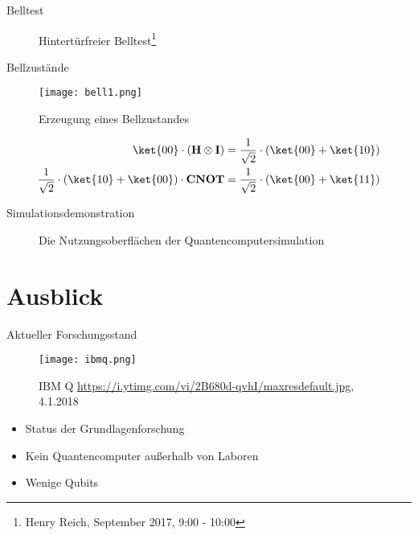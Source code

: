 \documentclass[]{beamer}
\begin{document}
\begin{frame}{Belltest}
\begin{figure}
	
\caption{Hintertürfreier Belltest\footnote{Henry Reich, September 2017, 9:00 - 10:00}}
\end{figure}
\end{frame}

\begin{frame}{Bellzustände}
\begin{figure}
	\texttt{[image: bell1.png]}
	\caption{Erzeugung eines Bellzustandes}
	\end{figure}
\begin{align*}
	\ket{00}\cdot(\textbf{H}\otimes \textbf{I}) &= \frac{1}{\sqrt{2}}\cdot(\ket{00}+\ket{10})\\
	\frac{1}{\sqrt{2}}\cdot(\ket{10}+\ket{00})\cdot \textbf{CNOT} &= \frac{1}{\sqrt{2}}\cdot(\ket{00}+\ket{11})
\end{align*}
\end{frame}

\begin{frame}{Simulationsdemonstration}
\begin{figure}
	\caption{Die Nutzungsoberflächen der Quantencomputersimulation}
	\end{figure}
\end{frame}

\section{Ausblick}
\begin{frame}{Aktueller Forschungsstand}
\begin{center}
\begin{figure}
\texttt{[image: ibmq.png]}
\caption{IBM Q \newline \footnotesize{\url{https://i.ytimg.com/vi/2B680d-qvhI/maxresdefault.jpg}, 4.1.2018}}
\end{figure}
	\begin{itemize}
	\item Status der Grundlagenforschung
    \item Kein Quantencomputer außerhalb von Laboren
    \item Wenige Qubits
	\end{itemize}
\end{center}
\end{frame}
\end{document}
